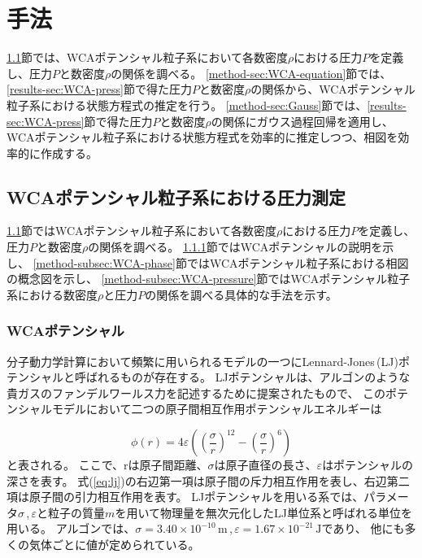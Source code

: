 \documentclass[titlepage]{jsreport}
\begin{document}
\chapter{手法} \label{chap:method}
\ref{method-sec:WCA-press}節では、WCAポテンシャル粒子系において各数密度$\rho$における圧力$P$を定義し、圧力$P$と数密度$\rho$の関係を調べる。
\ref{method-sec:WCA-equation}節では、\ref{results-sec:WCA-press}節で得た圧力$P$と数密度$\rho$の関係から、WCAポテンシャル粒子系における状態方程式の推定を行う。
\ref{method-sec:Gauss}節では、\ref{results-sec:WCA-press}節で得た圧力$P$と数密度$\rho$の関係にガウス過程回帰を適用し、
WCAポテンシャル粒子系における状態方程式を効率的に推定しつつ、相図を効率的に作成する。


\section{WCAポテンシャル粒子系における圧力測定}\label{method-sec:WCA-press}
\ref{method-sec:WCA-press}節ではWCAポテンシャル粒子系において各数密度$\rho$における圧力$P$を定義し、圧力$P$と数密度$\rho$の関係を調べる。
\ref{method-subsec:WCA}節ではWCAポテンシャルの説明を示し、
\ref{method-subsec:WCA-phase}節ではWCAポテンシャル粒子系における相図の概念図を示し、
\ref{method-subsec:WCA-pressure}節ではWCAポテンシャル粒子系における数密度$\rho$と圧力$P$の関係を調べる具体的な手法を示す。


\subsection{WCAポテンシャル}\label{method-subsec:WCA}
分子動力学計算において頻繁に用いられるモデルの一つにLennard-Jones\,(LJ)ポテンシャルと呼ばれるものが存在する。
LJポテンシャルは、アルゴンのような貴ガスのファンデルワールス力を記述するために提案\cite{Lennard_Jones_1931}されたもので、
このポテンシャルモデルにおいて二つの原子間相互作用ポテンシャルエネルギーは

\large
\begin{equation}
\phi(r)=4{\varepsilon}\left(\left(\frac{\sigma}{r}\right)^{12}-\left(\frac{\sigma}{r}\right)^6\right)\label{eq:lj}
\end{equation}
\normalsize
と表される。
ここで、rは原子間距離、${\sigma}$は原子直径の長さ、${\varepsilon}$はポテンシャルの深さを表す。
式(\ref{eq:lj})の右辺第一項は原子間の斥力相互作用を表し、右辺第二項は原子間の引力相互作用を表す。
LJポテンシャルを用いる系では、パラメータ$\sigma$\,,\,$\varepsilon$と粒子の質量$m$を用いて物理量を無次元化したLJ単位系と呼ばれる単位を用いる。
アルゴンでは、${\sigma}=3.40×10^{-10}\,\mathrm{m}$\,,\,${\varepsilon}=1.67×10^{-21}\,\mathrm{J}$であり\cite{argon-parameters}、
他にも多くの気体ごとに値が定められている\cite{graphane-parameters,many-parameters}。
\end{document}
